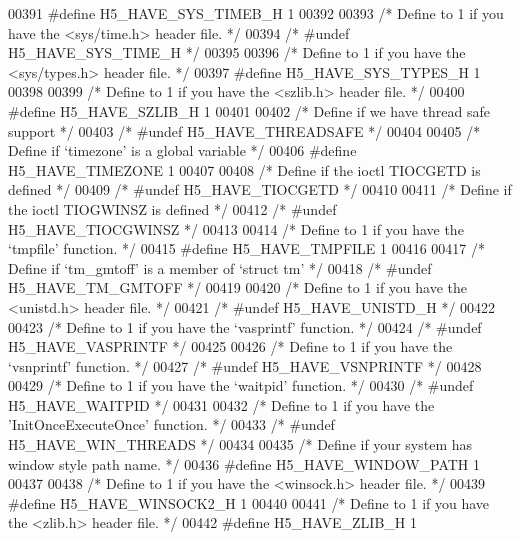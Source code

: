 \begin{DoxyCode}
{00391 \textcolor{preprocessor}{#define H5\_HAVE\_SYS\_TIMEB\_H 1}
00392 
00393 \textcolor{comment}{/* Define to 1 if you have the <sys/time.h> header file. */}
00394 \textcolor{comment}{/* #undef H5\_HAVE\_SYS\_TIME\_H */}
00395 
00396 \textcolor{comment}{/* Define to 1 if you have the <sys/types.h> header file. */}
00397 \textcolor{preprocessor}{#define H5\_HAVE\_SYS\_TYPES\_H 1}
00398 
00399 \textcolor{comment}{/* Define to 1 if you have the <szlib.h> header file. */}
00400 \textcolor{preprocessor}{#define H5\_HAVE\_SZLIB\_H 1}
00401 
00402 \textcolor{comment}{/* Define if we have thread safe support */}
00403 \textcolor{comment}{/* #undef H5\_HAVE\_THREADSAFE */}
00404 
00405 \textcolor{comment}{/* Define if `timezone' is a global variable */}
00406 \textcolor{preprocessor}{#define H5\_HAVE\_TIMEZONE 1}
00407 
00408 \textcolor{comment}{/* Define if the ioctl TIOCGETD is defined */}
00409 \textcolor{comment}{/* #undef H5\_HAVE\_TIOCGETD */}
00410 
00411 \textcolor{comment}{/* Define if the ioctl TIOGWINSZ is defined */}
00412 \textcolor{comment}{/* #undef H5\_HAVE\_TIOCGWINSZ */}
00413 
00414 \textcolor{comment}{/* Define to 1 if you have the `tmpfile' function. */}
00415 \textcolor{preprocessor}{#define H5\_HAVE\_TMPFILE 1}
00416 
00417 \textcolor{comment}{/* Define if `tm\_gmtoff' is a member of `struct tm' */}
00418 \textcolor{comment}{/* #undef H5\_HAVE\_TM\_GMTOFF */}
00419 
00420 \textcolor{comment}{/* Define to 1 if you have the <unistd.h> header file. */}
00421 \textcolor{comment}{/* #undef H5\_HAVE\_UNISTD\_H */}
00422 
00423 \textcolor{comment}{/* Define to 1 if you have the `vasprintf' function. */}
00424 \textcolor{comment}{/* #undef H5\_HAVE\_VASPRINTF */}
00425 
00426 \textcolor{comment}{/* Define to 1 if you have the `vsnprintf' function. */}
00427 \textcolor{comment}{/* #undef H5\_HAVE\_VSNPRINTF */}
00428 
00429 \textcolor{comment}{/* Define to 1 if you have the `waitpid' function. */}
00430 \textcolor{comment}{/* #undef H5\_HAVE\_WAITPID */}
00431 
00432 \textcolor{comment}{/* Define to 1 if you have the 'InitOnceExecuteOnce' function. */}
00433 \textcolor{comment}{/* #undef H5\_HAVE\_WIN\_THREADS */}
00434 
00435 \textcolor{comment}{/* Define if your system has window style path name. */}
00436 \textcolor{preprocessor}{#define H5\_HAVE\_WINDOW\_PATH 1}
00437 
00438 \textcolor{comment}{/* Define to 1 if you have the <winsock.h> header file. */}
00439 \textcolor{preprocessor}{#define H5\_HAVE\_WINSOCK2\_H 1}
00440 
00441 \textcolor{comment}{/* Define to 1 if you have the <zlib.h> header file. */}
00442 \textcolor{preprocessor}{#define H5\_HAVE\_ZLIB\_H 1}
}
\end{DoxyCode}
